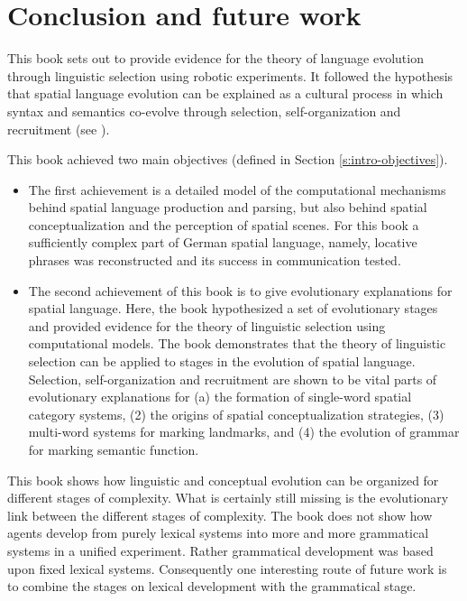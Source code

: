 %

\chapter{Conclusion and future work}

This book sets out to provide evidence for the theory
of language evolution through linguistic selection using robotic experiments. 
It followed the hypothesis that spatial language evolution can be explained 
as a cultural process in which syntax and semantics co-evolve through
selection, self-organization and recruitment (see ).

This book achieved two main objectives (defined  in Section \ref{s:intro-objectives}). 
\begin{itemize}
\item The first achievement is a detailed  model of the computational mechanisms behind 
spatial language production and parsing, but also behind spatial conceptualization
and the perception of spatial scenes. For this book a sufficiently complex 
part of German spatial language, namely, locative phrases was reconstructed and
its success in communication tested. 
\item The second achievement of this book is to give evolutionary explanations for spatial 
language. Here, the book hypothesized a set of evolutionary stages and provided
evidence for the theory of linguistic selection using computational models. 
The book demonstrates that the theory of linguistic selection can be applied 
to stages in the evolution of spatial language. Selection, self-organization and recruitment
are shown to be vital parts of evolutionary explanations for (a) the formation of single-word 
spatial category systems, (2) the origins of spatial conceptualization strategies, (3) 
multi-word systems for marking landmarks, and (4) the evolution of grammar for 
marking semantic function.
\end{itemize}
This book shows how linguistic and conceptual evolution can 
be organized for different stages of complexity. What is certainly still missing 
is the evolutionary link between the different stages of complexity. 
The book does not show how agents develop from purely lexical systems
into more and more grammatical systems in a unified experiment.
Rather grammatical development was based upon fixed lexical systems.
Consequently one interesting route of future work is to combine the stages on lexical
development with the grammatical stage.

